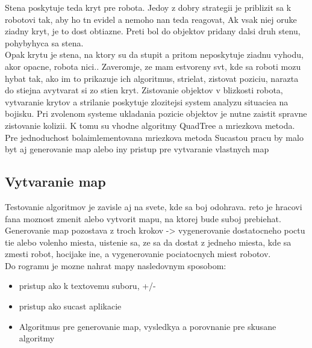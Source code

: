 \documentclass[a4paper,11pt,final]{report}
\begin{document}
Stena poskytuje teda kryt pre robota. Jedoy z dobry strategii je priblizit sa k robotovi tak, aby ho tn evidel a nemoho nan teda reagovat, Ak vsak niej oruke ziadny kryt, je to dost obtiazne. Preti bol do objektov pridany dalsi druh stenu, pohybyhyca sa stena.\\
Opak krytu je stena, na ktory su da stupit a pritom neposkytuje ziadnu vyhodu, akor opacne, robota nici..%
Zaveromje, ze mam estvoreny svt, kde sa roboti mozu hybat tak, ako im to prikazuje ich algoritmus, strielat, zistovat poziciu, narazta do stiejna avytvarat si zo stien kryt. Zistovanie objektov v blizkosti robota, vytvaranie krytov a strilanie poskytuje zlozitejsi system analyzu situaciea na bojisku.
Pri zvolenom systeme ukladania pozicie objektov je nutne zaistit spravne zistovanie kolizii. K tomu su vhodne algoritmy QuadTree a mriezkova metoda. %
Pre jednoduchost bolaimlementovana mriezkova metoda
Sucastou pracu by malo byt aj generovanie map alebo iny pristup pre vytvaranie vlastnych map
\subsection{Vytvaranie map}
Testovanie algoritmov je zavisle aj na svete, kde sa boj odohrava. reto je hracovi fana moznost zmenit alebo vytvorit mapu, na ktorej bude suboj prebiehat.
Generovanie map pozostava z troch krokov -> vygenerovanie dostatocneho poctu tie alebo volenho miesta, uistenie sa, ze sa da dostat z jedneho miesta, kde sa zmesti robot, hocijake ine, a vygenerovanie pociatocnych miest robotov.\\
Do rogramu je mozne nahrat mapy nasledovnym sposobom:

\begin{itemize}
\item pristup ako k textovemu suboru, +/-
\item pristup ako sucast aplikacie
\item Algoritmus pre generovanie map, vysledkya a porovnanie pre skusane algoritmy
\end{itemize}
\end{document}
